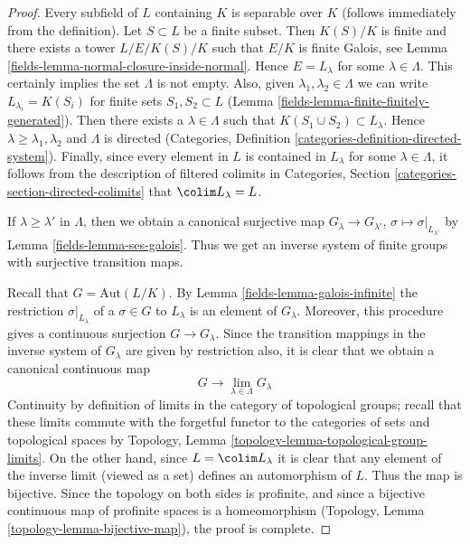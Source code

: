 \begin{proof}

Every subfield of $L$ containing $K$ is separable over $K$
(follows immediately from the definition). Let $S \subset L$
be a finite subset. Then $K(S)/K$ is finite and there exists
a tower $L/E/K(S)/K$ such that $E/K$ is finite Galois, see
Lemma \ref{fields-lemma-normal-closure-inside-normal}.
Hence $E = L_\lambda$ for some $\lambda \in \Lambda$.
This certainly implies the set $\Lambda$ is not empty.
Also, given $\lambda_1, \lambda_2 \in \Lambda$ we can
write $L_{\lambda_i} = K(S_i)$ for finite sets
$S_1, S_2 \subset L$ (Lemma \ref{fields-lemma-finite-finitely-generated}).
Then there exists a $\lambda \in \Lambda$ such that
$K(S_1 \cup S_2) \subset L_\lambda$. Hence
$\lambda \geq \lambda_1, \lambda_2$ and
$\Lambda$ is directed (Categories, Definition
\ref{categories-definition-directed-system}).
Finally, since every element in $L$ is contained in
$L_\lambda$ for some $\lambda \in \Lambda$, it follows
from the description of filtered colimits in
Categories, Section \ref{categories-section-directed-colimits}
that $\colim L_\lambda = L$.

\medskip\noindent
If $\lambda \geq \lambda'$ in $\Lambda$, then we obtain a
canonical surjective map $G_\lambda \to G_{\lambda'}$,
$\sigma \mapsto \sigma|_{L_{\lambda'}}$
by Lemma \ref{fields-lemma-ses-galois}. Thus we get an inverse
system of finite groups with surjective transition maps.

\medskip\noindent
Recall that $G = \text{Aut}(L/K)$. By Lemma \ref{fields-lemma-galois-infinite}
the restriction $\sigma|_{L_\lambda}$ of a $\sigma \in G$ to $L_\lambda$
is an element of $G_\lambda$. Moreover, this procedure gives a continuous
surjection $G \to G_\lambda$. Since the transition mappings
in the inverse system of $G_\lambda$ are given by restriction
also, it is clear that we obtain a canonical continuous map
$$
G \longrightarrow \lim_{\lambda \in \Lambda} G_\lambda
$$
Continuity by definition of limits in the category of topological
groups; recall that these limits commute with the forgetful functor
to the categories of sets and topological spaces by
Topology, Lemma \ref{topology-lemma-topological-group-limits}.
On the other hand, since $L = \colim L_\lambda$ it is clear
that any element of the inverse limit (viewed as a set) defines an
automorphism of $L$. Thus the map is bijective. Since the topology
on both sides is profinite, and since a bijective continuous map
of profinite spaces is a homeomorphism
(Topology, Lemma \ref{topology-lemma-bijective-map}), the proof is complete.
\end{proof}

